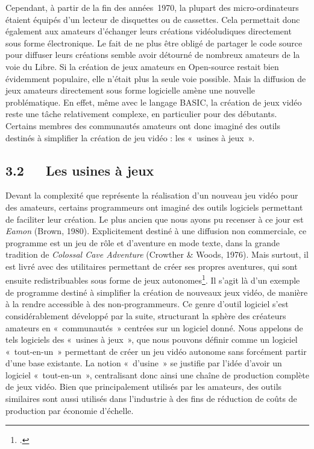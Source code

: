 \documentclass{FramateX}
\begin{document}
\begin{refsection}
Cependant, à partir de la fin des années~1970, la plupart des
micro-ordinateurs étaient équipés d'un lecteur de disquettes ou de
cassettes. Cela permettait donc également aux amateurs d'échanger leurs
créations vidéoludiques directement sous forme électronique. Le fait de
ne plus être obligé de partager le code source pour diffuser leurs
créations semble avoir détourné de nombreux amateurs de la voie du
Libre. Si la création de jeux amateurs en Open-source restait bien
évidemment populaire, elle n'était plus la seule voie possible. Mais la
diffusion de jeux amateurs directement sous forme logicielle amène une
nouvelle problématique. En effet, même avec le langage BASIC, la
création de jeux vidéo reste une tâche relativement complexe, en
particulier pour des débutants. Certains membres des communautés
amateurs ont donc imaginé des outils destinés à simplifier la création
de jeu vidéo : les «~usines à jeux~».

\subsection*{3.2~~~Les usines à jeux}
{}

Devant la complexité que représente la réalisation d'un nouveau jeu
vidéo pour des amateurs, certains programmeurs ont imaginé des outils
logiciels permettant de faciliter leur création. Le plus ancien que
nous ayons pu recenser à ce jour est
\textit{Eamon} (Brown, 1980). Explicitement
destiné à une diffusion non commerciale, ce programme est un jeu de
rôle et d'aventure en mode texte, dans la grande tradition de
\textit{Colossal Cave Adventure} (Crowther \& Woods, 1976). Mais surtout, il est livré avec des utilitaires
permettant de créer ses propres aventures, qui sont ensuite
redistribuables sous forme de jeux autonomes\footnote{\cite{kunzebrief2008}.}. Il
s'agit là d'un exemple de programme destiné à simplifier la création de
nouveaux jeux vidéo, de manière à la rendre accessible à des
non-programmeurs. Ce genre d'outil logiciel s'est considérablement
développé par la suite, structurant la sphère des créateurs amateurs en
«~communautés~» centrées sur un logiciel donné. Nous appelons de tels
logiciels des «~usines à jeux~», que nous pouvons définir comme un
logiciel «~tout-en-un~» permettant de créer un jeu vidéo autonome sans
forcément partir d'une base existante. La notion «~d'usine~» se
justifie par l'idée d'avoir un logiciel «~tout-en-un~», centralisant
donc ainsi une chaîne de production complète de jeux vidéo. Bien que
principalement utilisés par les amateurs, des outils similaires sont
aussi utilisés dans l'industrie à des fins de réduction de coûts de
production par économie d'échelle.


\end{refsection}
\end{document}
